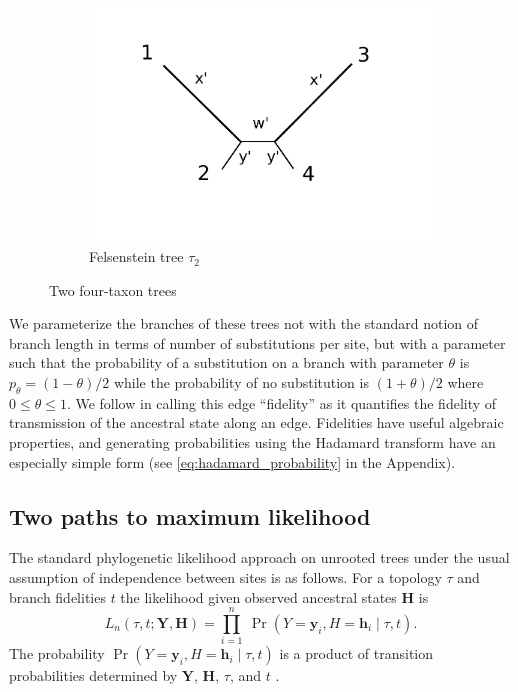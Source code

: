 \documentclass{article}
\newcommand{\fullAlignment}{\mathbf{Y}}
\newcommand{\alignmentColumn}{\mathbf{y}}
\newcommand{\alignmentColumnRV}{Y}
\newcommand{\fullAncestralStates}{\mathbf{H}}
\newcommand{\ancestralStateColumn}{\mathbf{h}}
\newcommand{\ancestralStateColumnRV}{H}
\newcommand{\nCols}{n}
\begin{document}
\begin{figure}
\begin{subfigure}{.45\linewidth}
\includegraphics[width=.95\textwidth]{felsenstein_blank}
\caption[short]{Felsenstein tree $\tau_2$}
\end{subfigure}
\caption{Two four-taxon trees}
\label{fig:farris-fels-top}
\end{figure}

We parameterize the branches of these trees not with the standard notion of branch length in terms of number of substitutions per site, but with a parameter such that the probability of a substitution on a branch with parameter $\theta$ is $p_\theta = (1-\theta)/2$ while the probability of no substitution is $(1+\theta)/2$ where $0 \le \theta \le 1$.
We follow \cite{Matsen2007-jq} in calling this edge ``fidelity'' as it quantifies the fidelity of transmission of the ancestral state along an edge.
Fidelities have useful algebraic properties, and generating probabilities using the Hadamard transform have an especially simple form (see \eqref{eq:hadamard_probability} in the Appendix).

\subsection*{Two paths to maximum likelihood}

The standard phylogenetic likelihood approach on unrooted trees under the usual assumption of independence between sites is as follows.
For a topology $\tau$ and branch fidelities $t$ the likelihood given observed ancestral states $\fullAncestralStates$ is
\begin{equation}
\label{eq:full_likelihood}
L_\nCols(\tau, t; \fullAlignment,\fullAncestralStates) = \prod_{i=1}^{\nCols} \ \Pr(\alignmentColumnRV=\alignmentColumn_i, \ancestralStateColumnRV=\ancestralStateColumn_i \mid \tau, t).
\end{equation}
The probability $\Pr(\alignmentColumnRV=\alignmentColumn_i, \ancestralStateColumnRV=\ancestralStateColumn_i \mid \tau, t)$ is a product of transition probabilities determined by $\fullAlignment$, $\fullAncestralStates$, $\tau$, and $t$ \cite{Felsenstein2004}.
\end{document}

